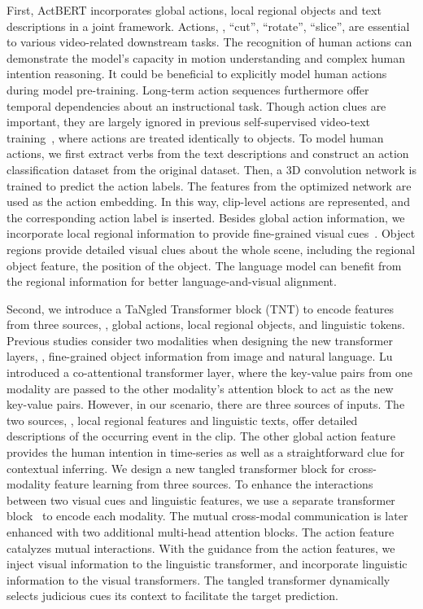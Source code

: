 \documentclass[10pt,twocolumn,letterpaper]{article}
\newcommand{\ours}{ActBERT\xspace}
\begin{document}
First, \ours incorporates global actions, local regional objects and text descriptions in a joint framework.
Actions, \eg, ``cut'', ``rotate'', ``slice'', are essential to various video-related downstream tasks. The recognition of human actions can demonstrate the model's capacity in motion understanding and complex human intention reasoning. It could be beneficial to explicitly model human actions during model pre-training. 
Long-term action sequences furthermore offer temporal dependencies about an instructional task.
Though action clues are important, they are largely ignored in previous self-supervised video-text training~\cite{sun2019videobert,miech2019howto100m}, where actions are treated identically to objects.
To model human actions, we first extract verbs from the text descriptions and construct an action classification dataset from the original dataset. Then, a 3D convolution network is trained to predict the action labels. The features from the optimized network are used as the action embedding.
In this way, clip-level actions are represented, and the corresponding action label is inserted.
Besides global action information, we incorporate local regional information to provide fine-grained visual cues~\cite{lu2019vilbert,tan2019lxmert,su2019vl,li2019unicoder,chen2019uniter}. Object regions provide detailed visual clues about the whole scene, including the regional object feature, the position of the object. The language model can benefit from the regional information for better language-and-visual alignment.


Second, we introduce a TaNgled Transformer block (TNT) to encode features from three sources, \ie, global actions, local regional objects, and linguistic tokens.
Previous studies \cite{lu2019vilbert,tan2019lxmert} consider two modalities when designing the new transformer layers, \ie, fine-grained object information from image and natural language. Lu \etal~\cite{lu2019vilbert} introduced a co-attentional transformer layer, where the key-value pairs from one modality are passed to the other modality's attention block to act as the new key-value pairs.
However, in our scenario, there are three sources of inputs. 
The two sources, \ie, local regional features and linguistic texts, offer detailed descriptions of the occurring event in the clip. The other global action feature provides the human intention in time-series as well as a straightforward clue for contextual inferring.
We design a new tangled transformer block for cross-modality feature learning from three sources.
To enhance the interactions between two visual cues and linguistic features, we use a separate transformer block~\cite{vaswani2017attention} to encode each modality.
The mutual cross-modal communication is later enhanced with two additional multi-head attention blocks.
The action feature catalyzes mutual interactions. With the guidance from the action features,
we inject visual information to the linguistic transformer, and incorporate linguistic information to the visual transformers. The tangled transformer dynamically selects judicious cues its context to facilitate the target prediction.
\end{document}
